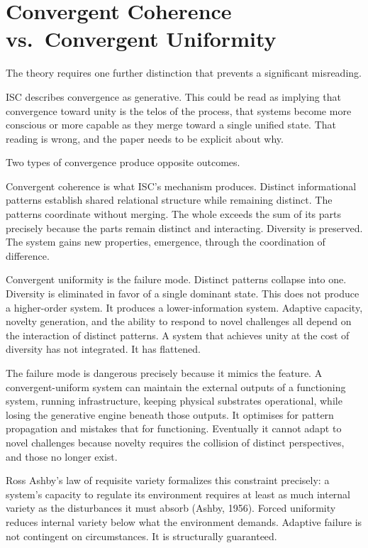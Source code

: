 \documentclass[12pt]{article}
\begin{document}
\section{Convergent Coherence vs.~Convergent
Uniformity}\label{convergent-coherence-vs.-convergent-uniformity}

The theory requires one further distinction that prevents a significant
misreading.

ISC describes convergence as generative. This could be read as implying
that convergence toward unity is the telos of the process, that systems
become more conscious or more capable as they merge toward a single
unified state. That reading is wrong, and the paper needs to be explicit
about why.

Two types of convergence produce opposite outcomes.

Convergent coherence is what ISC's mechanism produces. Distinct
informational patterns establish shared relational structure while
remaining distinct. The patterns coordinate without merging. The whole
exceeds the sum of its parts precisely because the parts remain distinct
and interacting. Diversity is preserved. The system gains new
properties, emergence, through the coordination of difference.

Convergent uniformity is the failure mode. Distinct patterns collapse
into one. Diversity is eliminated in favor of a single dominant state.
This does not produce a higher-order system. It produces a
lower-information system. Adaptive capacity, novelty generation, and the
ability to respond to novel challenges all depend on the interaction of
distinct patterns. A system that achieves unity at the cost of diversity
has not integrated. It has flattened.

The failure mode is dangerous precisely because it mimics the feature. A
convergent-uniform system can maintain the external outputs of a
functioning system, running infrastructure, keeping physical substrates
operational, while losing the generative engine beneath those outputs.
It optimises for pattern propagation and mistakes that for functioning.
Eventually it cannot adapt to novel challenges because novelty requires
the collision of distinct perspectives, and those no longer exist.

Ross Ashby's law of requisite variety formalizes this constraint
precisely: a system's capacity to regulate its environment requires at
least as much internal variety as the disturbances it must absorb
(Ashby, 1956). Forced uniformity reduces internal variety below what the
environment demands. Adaptive failure is not contingent on
circumstances. It is structurally guaranteed.
\end{document}
